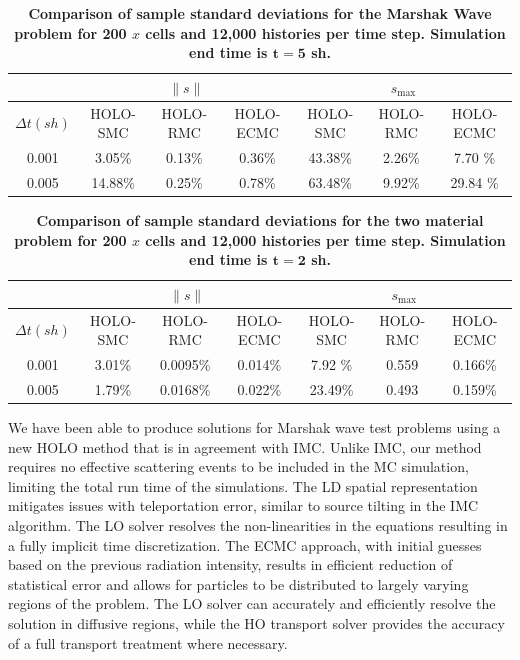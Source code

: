\documentclass{mc2013}
\renewcommand{\ss}{\ensuremath{\|s\|}}
\begin{document}
\begin{table}[H]
\centering
\caption{\label{marshak_var} \textbf{Comparison of sample standard deviations for the Marshak Wave problem
    for 200 $x$ cells and 12,000 histories per time step.   Simulation end time is $\mathbf{t=5}$ sh.}}
\vspace{-0.1in}
\begin{tabular}{|c|ccc|ccc|}\cline{2-7}
    \multicolumn{1}{c|}{}       & \multicolumn{3}{|c|}{\ss} & \multicolumn{3}{|c|}{$s_{\max}$} \\ \hline
$\Delta t (sh)$ & HOLO-SMC & HOLO-RMC & HOLO-ECMC  & HOLO-SMC & HOLO-RMC & HOLO-ECMC   \\ \hline
   0.001	      & 3.05\%   & 0.13\% &  0.36\% &  43.38\%  & 2.26\%  &  7.70 \%            \\
   0.005          & 14.88\%  & 0.25\% &  0.78\% &  63.48\%  & 9.92\%  & 29.84 \%     \\ \hline
\end{tabular}
\end{table}


\begin{table}[H]
\centering
\caption{\label{marshak_var} \textbf{Comparison of sample standard deviations for the
    two material problem
    for 200 $x$ cells and 12,000 histories per time step.   Simulation end time is $\mathbf{t=2}$ sh.}}
\vspace{-0.1in}
\begin{tabular}{|c|ccc|ccc|}\cline{2-7}
    \multicolumn{1}{c|}{}       & \multicolumn{3}{|c|}{\ss} & \multicolumn{3}{|c|}{$s_{\max}$} \\ \hline
$\Delta t (sh)$ & HOLO-SMC & HOLO-RMC & HOLO-ECMC  & HOLO-SMC & HOLO-RMC & HOLO-ECMC   \\ \hline
   0.001	      &  3.01\% & 0.0095\% & 0.014\% & 7.92 \%  & 0.559  & 0.166\%            \\
   0.005          &  1.79\% & 0.0168\% & 0.022\% & 23.49\%  & 0.493  & 0.159\%     \\ \hline
\end{tabular}
\end{table}







We have been able to produce solutions for Marshak wave test problems using
a new HOLO method that is in agreement with IMC.  Unlike IMC, our method requires no effective scattering
events to be included in the MC simulation, limiting the total run time of the
simulations.  The LD spatial representation
mitigates issues with teleportation error, similar to source tilting in the IMC
algorithm.   The LO solver resolves the non-linearities in the equations resulting in a fully
implicit time discretization.  The ECMC approach, with initial guesses based on the
previous radiation intensity, results in efficient reduction of statistical error and
allows for particles to be distributed to largely varying regions of the problem.
The LO solver
can accurately and efficiently resolve the solution in diffusive regions, while the HO
transport solver provides the accuracy of a full transport treatment where necessary. 
\end{document}
